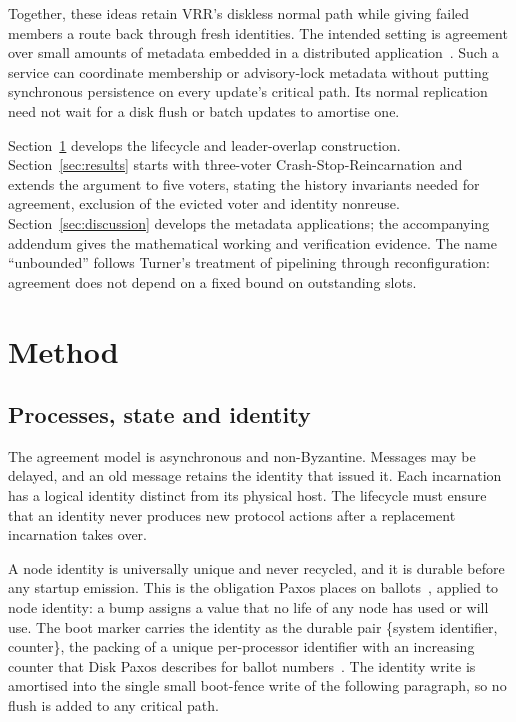 \documentclass[10pt,journal,letterpaper]{IEEEtran}
\begin{document}
Together, these ideas retain VRR's diskless normal path while giving failed
members a route back through fresh identities.
The intended setting is agreement over small amounts of metadata embedded in a
distributed application~\cite{motivation}.
Such a service can coordinate membership or advisory-lock metadata without
putting synchronous persistence on every update's critical path.
Its normal replication need not wait for a disk flush or batch updates to
amortise one.

Section~\ref{sec:method} develops the lifecycle and leader-overlap construction.
Section~\ref{sec:results} starts with three-voter Crash-Stop-Reincarnation
and extends the argument to five voters, stating the history invariants needed
for agreement, exclusion of the evicted voter and identity nonreuse.
Section~\ref{sec:discussion} develops the metadata applications; the accompanying
addendum gives the mathematical working and verification evidence.
The name ``unbounded'' follows Turner's treatment of pipelining through
reconfiguration: agreement does not depend on a fixed bound on outstanding slots.

\section{Method}\label{sec:method}
\subsection{Processes, state and identity}
The agreement model is asynchronous and non-Byzantine. Messages may be delayed, and an old message retains the identity that issued it. Each incarnation has a logical identity distinct from its physical host. The lifecycle must ensure that an identity never produces new protocol actions after a replacement incarnation takes over.

A node identity is universally unique and never recycled, and it is durable before any startup emission. This is the obligation Paxos places on ballots~\cite{pms}, applied to node identity: a bump assigns a value that no life of any node has used or will use. The boot marker carries the identity as the durable pair \{system identifier, counter\}, the packing of a unique per-processor identifier with an increasing counter that Disk Paxos describes for ballot numbers~\cite{diskpaxos}. The identity write is amortised into the single small boot-fence write of the following paragraph, so no flush is added to any critical path.
\end{document}
